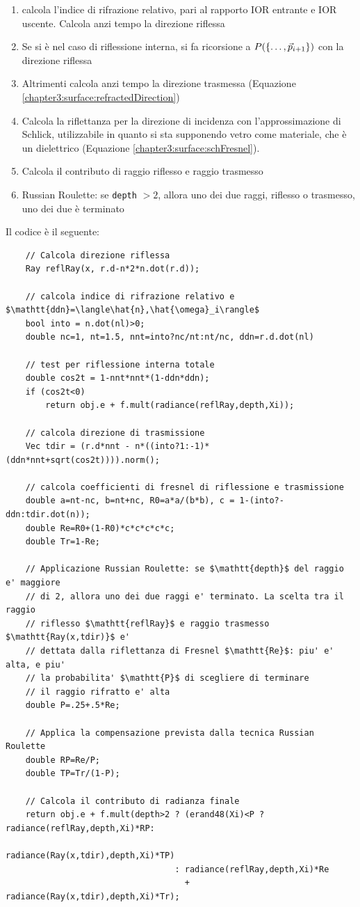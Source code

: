 \begin{enumerate}[topsep=0pt,noitemsep]
	\item calcola l'indice di rifrazione relativo, pari al rapporto IOR entrante e IOR uscente. Calcola anzi tempo la direzione riflessa
	\item Se si \`e nel caso di riflessione interna, si fa ricorsione a $P(\{\ldots,\vec{p}_{i+1}\})$ con la direzione riflessa
	\item Altrimenti calcola anzi tempo la direzione trasmessa (Equazione \ref{chapter3:surface:refractedDirection})
	\item Calcola la riflettanza per la direzione di incidenza con l'approssimazione di Schlick, utilizzabile in quanto si sta supponendo vetro 
		come materiale, che \`e un dielettrico (Equazione \ref{chapter3:surface:schFresnel}).
	\item Calcola il contributo di raggio riflesso e raggio trasmesso
	\item Russian Roulette: se \texttt{depth} $> 2$, allora uno dei due raggi, riflesso o trasmesso, uno dei due \`e terminato
\end{enumerate}
Il codice \`e il seguente:
\begin{verbatim}
	// Calcola direzione riflessa
	Ray reflRay(x, r.d-n*2*n.dot(r.d));

	// calcola indice di rifrazione relativo e $\mathtt{ddn}=\langle\hat{n},\hat{\omega}_i\rangle$
	bool into = n.dot(nl)>0;
	double nc=1, nt=1.5, nnt=into?nc/nt:nt/nc, ddn=r.d.dot(nl)

	// test per riflessione interna totale
	double cos2t = 1-nnt*nnt*(1-ddn*ddn);
	if (cos2t<0)
		return obj.e + f.mult(radiance(reflRay,depth,Xi));

	// calcola direzione di trasmissione
	Vec tdir = (r.d*nnt - n*((into?1:-1)*(ddn*nnt+sqrt(cos2t)))).norm();

	// calcola coefficienti di fresnel di riflessione e trasmissione
	double a=nt-nc, b=nt+nc, R0=a*a/(b*b), c = 1-(into?-ddn:tdir.dot(n));
	double Re=R0+(1-R0)*c*c*c*c*c;
	double Tr=1-Re;

	// Applicazione Russian Roulette: se $\mathtt{depth}$ del raggio e' maggiore 
	// di 2, allora uno dei due raggi e' terminato. La scelta tra il raggio 
	// riflesso $\mathtt{reflRay}$ e raggio trasmesso $\mathtt{Ray(x,tdir)}$ e' 
	// dettata dalla riflettanza di Fresnel $\mathtt{Re}$: piu' e' alta, e piu' 
	// la probabilita' $\mathtt{P}$ di scegliere di terminare 
	// il raggio rifratto e' alta
	double P=.25+.5*Re;

	// Applica la compensazione prevista dalla tecnica Russian Roulette
	double RP=Re/P;
	double TP=Tr/(1-P);

	// Calcola il contributo di radianza finale
	return obj.e + f.mult(depth>2 ? (erand48(Xi)<P ? radiance(reflRay,depth,Xi)*RP:
	                                                 radiance(Ray(x,tdir),depth,Xi)*TP)
	                              : radiance(reflRay,depth,Xi)*Re 
	                                + radiance(Ray(x,tdir),depth,Xi)*Tr);
\end{verbatim}
